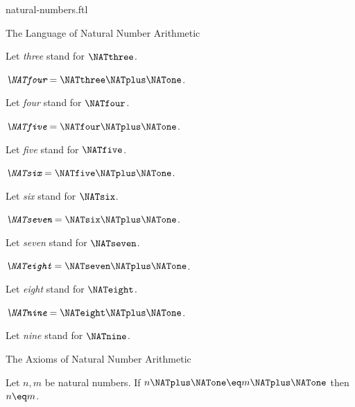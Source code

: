 \documentclass{naproche-library}
\begin{document}
\begin{smodule}[title=Natural Numbers]{natural-numbers.ftl}
\begin{sfragment}{The Language of Natural Number Arithmetic}
\begin{definition}[forthel,id=ARITHMETIC_01_3836725109456896]
    Let \emph{three} stand for $\NATthree$.
  \end{definition}

  \begin{definition}[forthel,id=ARITHMETIC_01_1709884968009728]
    $\emph{\NATfour} = \NATthree \NATplus \NATone$.

    Let \emph{four} stand for $\NATfour$.
  \end{definition}

  \begin{definition}[forthel,id=ARITHMETIC_01_6734726333202432]
    $\emph{\NATfive} = \NATfour \NATplus \NATone$.

    Let \emph{five} stand for $\NATfive$.
  \end{definition}

  \begin{definition}[forthel,id=ARITHMETIC_01_949139189792768]
    $\emph{\NATsix} = \NATfive \NATplus \NATone$.

    Let \emph{six} stand for $\NATsix$.
  \end{definition}

  \begin{definition}[forthel,id=ARITHMETIC_01_7245471749767168]
    $\emph{\NATseven} = \NATsix \NATplus \NATone$.

    Let \emph{seven} stand for $\NATseven$.
  \end{definition}

  \begin{definition}[forthel,id=ARITHMETIC_01_5658172888973312]
    $\emph{\NATeight} = \NATseven \NATplus \NATone$.

    Let \emph{eight} stand for $\NATeight$.
  \end{definition}

  \begin{definition}[forthel,id=ARITHMETIC_01_7371844250238976]
    $\emph{\NATnine} = \NATeight \NATplus \NATone$.

    Let \emph{nine} stand for $\NATnine$.
  \end{definition}
\end{sfragment}

\begin{sfragment}{The Axioms of Natural Number Arithmetic}
  \begin{axiom}[forthel,id=ARITHMETIC_01_3604163883696128]
    Let $n, m$ be natural numbers.
    If $n \NATplus \NATone \eq m \NATplus \NATone$ then $n \eq m$.
  \end{axiom}


\end{sfragment}
\end{smodule}
\end{document}
